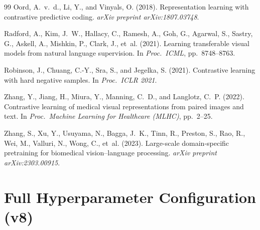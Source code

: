 \documentclass[11pt, a4paper]{article}
\begin{document}
\begin{thebibliography}{99}
Oord, A.~v.~d., Li, Y., and Vinyals, O. (2018).
\newblock Representation learning with contrastive predictive coding.
\newblock \textit{arXiv preprint arXiv:1807.03748}.

Radford, A., Kim, J.~W., Hallacy, C., Ramesh, A., Goh, G., Agarwal, S.,
  Sastry, G., Askell, A., Mishkin, P., Clark, J., et~al. (2021).
\newblock Learning transferable visual models from natural language
  supervision.
\newblock In \textit{Proc.\ ICML}, pp.\ 8748--8763.

Robinson, J., Chuang, C.-Y., Sra, S., and Jegelka, S. (2021).
\newblock Contrastive learning with hard negative samples.
\newblock In \textit{Proc.\ ICLR 2021}.

Zhang, Y., Jiang, H., Miura, Y., Manning, C.~D., and Langlotz, C.~P.
  (2022).
\newblock Contrastive learning of medical visual representations from
  paired images and text.
\newblock In \textit{Proc.\ Machine Learning for Healthcare (MLHC)},
  pp.\ 2--25.

Zhang, S., Xu, Y., Usuyama, N., Bagga, J.~K., Tinn, R., Preston, S.,
  Rao, R., Wei, M., Valluri, N., Wong, C., et~al. (2023).
\newblock Large-scale domain-specific pretraining for biomedical
  vision--language processing.
\newblock \textit{arXiv preprint arXiv:2303.00915}.

\end{thebibliography}

\appendix

\section{Full Hyperparameter Configuration (v8)}
\label{app:config}
\end{document}
